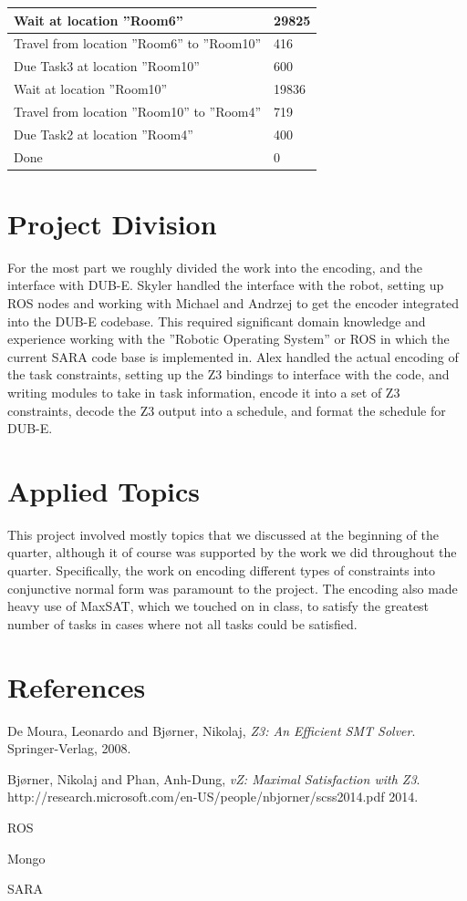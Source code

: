 \documentclass{article}
\begin{document}
\begin{center}
\begin{tabular}{ | p{5cm} | p{5cm} |}
    Wait at location ''Room6'' & 29825 \\ \hline
    Travel from location ''Room6'' to ''Room10'' & 416 \\ \hline
    Due Task3 at location ''Room10'' & 600 \\ \hline
    
    Wait at location ''Room10'' & 19836 \\ \hline
    Travel from location ''Room10'' to ''Room4'' & 719 \\ \hline
    Due Task2 at location ''Room4'' & 400 \\ \hline
    
    Done & 0 \\ \hline
    \end{tabular}
\end{center}

\section{Project Division}
For the most part we roughly divided the work into the encoding,
and the interface with DUB-E.
Skyler handled the interface with the robot,
setting up ROS nodes and working with Michael and Andrzej
to get the encoder integrated
into the DUB-E codebase. This required significant
domain knowledge and experience working with the
''Robotic Operating System'' or ROS in which the
current SARA code base is implemented in.
Alex handled the actual encoding of the task constraints,
setting up the Z3 bindings to interface with the code,
and writing modules to take in task information,
encode it into a set of Z3 constraints,
decode the Z3 output into a schedule,
and format the schedule for DUB-E.


\section{Applied Topics}
This project involved mostly topics
that we discussed at the beginning of the quarter,
although it of course was supported by
the work we did throughout the quarter.
Specifically, the work on encoding different types of constraints
into conjunctive normal form was paramount to the project.
The encoding also made heavy use of MaxSAT,
which we touched on in class,
to satisfy the greatest number of tasks
in cases where not all tasks could be satisfied.


\section{References}
\begin{thebibliography}{9}

  De Moura, Leonardo and Bj{\o}rner, Nikolaj,
  \emph{Z3: An Efficient SMT Solver}.
  Springer-Verlag,
  2008.

  Bj{\o}rner, Nikolaj and Phan, Anh-Dung,
  \emph{vZ: Maximal Satisfaction with Z3}.
  http://research.microsoft.com/en-US/people/nbjorner/scss2014.pdf
  2014.

\end{thebibliography}

ROS

Mongo

SARA
\end{document}
